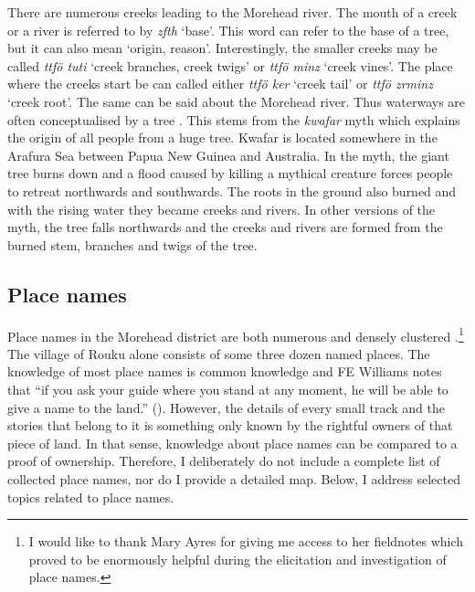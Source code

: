 There are numerous creeks leading to the Morehead river. The mouth of a creek or a river is referred to by \emph{zfth} `base'. This word can refer to the base of a tree, but it can also mean `origin, reason'. Interestingly, the smaller creeks may be called \emph{ttfö tuti} `creek branches, creek twigs' or \emph{ttfö minz} `creek vines'. The place where the creeks start be can called either \emph{ttfö ker} `creek tail' or \emph{ttfö zrminz} `creek root'. The same can be said about the Morehead river. Thus waterways are often conceptualised by a tree . This stems from the \emph{kwafar} myth which explains the origin of all people from a huge tree. Kwafar is located somewhere in the Arafura Sea between Papua New Guinea and Australia. In the myth, the giant tree burns down and a flood caused by killing a mythical creature forces people to retreat northwards and southwards. The roots in the ground also burned and with the rising water they became creeks and rivers. In other versions of the myth, the tree falls northwards and the creeks and rivers are formed from the burned stem, branches and twigs of the tree.

\subsection{Place names}\label{placenames}

Place names in the Morehead district are both numerous and densely clustered \citep[129]{Ayres:ws}.\footnote{I would like to thank Mary Ayres for giving me access to her fieldnotes which proved to be enormously helpful during the elicitation and investigation of place names.} The village of Rouku alone consists of some three dozen named places. The knowledge of most place names is common knowledge and FE Williams notes that ``if you ask your guide where you stand at any moment, he will be able to give a name to the land.'' (\citeyear[207]{Williams:1936transfly}). However, the details of every small track and the stories that belong to it is something only known by the rightful owners of that piece of land. In that sense, knowledge about place names can be compared to a proof of ownership. Therefore, I deliberately do not include a complete list of collected place names, nor do I provide a detailed map. Below, I address selected topics related to place names.\\

